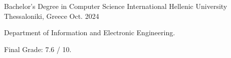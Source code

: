 

\begin{cventries}

  \cventry
    {Bachelor's Degree in Computer Science} %
    {International Hellenic University} %
    {Thessaloniki, Greece} %
    {Oct. 2024} %
    {
      \begin{cvitems} %
        \item {Department of Information and Electronic Engineering.}
        \item {Final Grade: 7.6 / 10.}
      \end{cvitems}
    }

\end{cventries}
